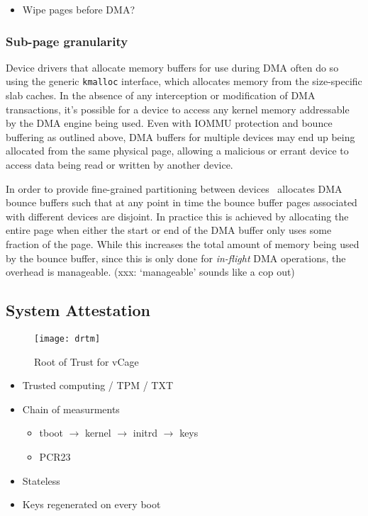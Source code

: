 \begin{itemize}
  \item Wipe pages before DMA?
\end{itemize}

\subsubsection{Sub-page granularity}
\label{sec:dma-subpage}
Device drivers that allocate memory buffers for use during DMA often do so using the generic {\tt kmalloc} interface, which allocates memory from the size-specific slab caches. In the absence of any interception or modification of DMA transactions, it's possible for a device to access any kernel memory addressable by the DMA engine being used. Even with IOMMU protection and bounce buffering as outlined above, DMA buffers for multiple devices may end up being allocated from the same physical page, allowing a malicious or errant device to access data being read or written by another device.

In order to provide fine-grained partitioning between devices \vcage\ allocates DMA bounce buffers such that at any point in time the bounce buffer pages associated with different devices are disjoint. In practice this is achieved by allocating the entire page when either the start or end of the DMA buffer only uses some fraction of the page. While this increases the total amount of memory being used by the bounce buffer, since this is only done for \emph{in-flight} DMA operations, the overhead is manageable. (xxx: `manageable' sounds like a cop out)

\subsection{System Attestation}

\begin{figure}[h]
\texttt{[image: drtm]}
\centering
\caption{Root of Trust for vCage}
\label{fig-drtm}
\end{figure}

\begin{itemize}
  \item Trusted computing / TPM / TXT
  \item Chain of measurments
    \begin{itemize}
      \item tboot $\to$ kernel $\to$ initrd $\to$ keys
      \item PCR23
    \end{itemize}
  \item Stateless
  \item Keys regenerated on every boot
\end{itemize}

